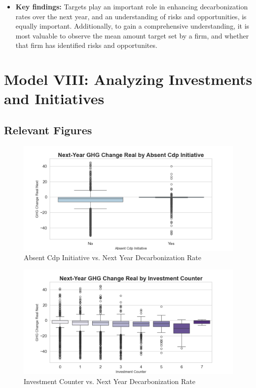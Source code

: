 \begin{itemize}
\item \textbf{Key findings:} Targets play an important role in enhancing decarbonization rates over the next year, and an understanding of risks and opportunities, is equally important. Additionally, to gain a comprehensive understanding, it is most valuable to observe the mean amount target set by a firm, and whether that firm has identified risks and opportunites.

\end{itemize}

\section{Model VIII: Analyzing Investments and Initiatives}



\subsection{Relevant Figures}

\begin{figure}[H]
\centering
  \includegraphics[width=\textwidth]{figures/ghg_change_real_next_by_absent_cdp_initiative.png}
\caption{Absent Cdp Initiative vs. Next Year Decarbonization Rate}
\label{fig:ghg_change_real_next_by_absent_cdp_initiative}
\end{figure}

\begin{figure}[H]
\centering
  \includegraphics[width=\textwidth]{figures/ghg_change_real_next_by_investment_counter.png}
\caption{Investment Counter vs. Next Year Decarbonization Rate}
\label{fig:ghg_change_real_next_by_investment_counter}
\end{figure}




